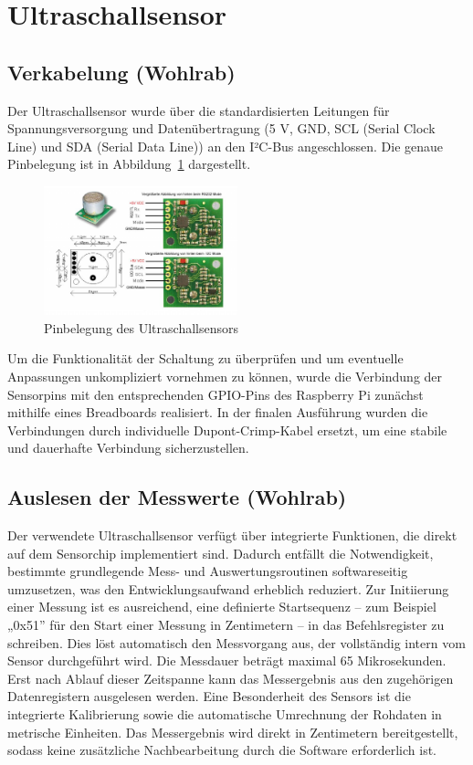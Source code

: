 \section{Ultraschallsensor}

\subsection{Verkabelung (Wohlrab)}

Der Ultraschallsensor wurde über die standardisierten Leitungen für Spannungsversorgung und Datenübertragung (5 V, GND, SCL (Serial Clock Line) und SDA (Serial Data Line)) an den I²C-Bus angeschlossen. 
Die genaue Pinbelegung ist in Abbildung~\ref{fig:ultraschall_pinbelegung} dargestellt.
\begin{figure}[ht]
    \centering
    \includegraphics[width=0.5\textwidth, keepaspectratio]{images/wohlrab_srf02.png}
    \caption{Pinbelegung des Ultraschallsensors \cite{bild_ultraschall}}
    \label{fig:ultraschall_pinbelegung}
\end{figure}
Um die Funktionalität der Schaltung zu überprüfen und um eventuelle Anpassungen unkompliziert vornehmen zu können, wurde die Verbindung der Sensorpins mit den entsprechenden GPIO-Pins des Raspberry Pi zunächst mithilfe eines Breadboards realisiert.
In der finalen Ausführung wurden die Verbindungen durch individuelle Dupont-Crimp-Kabel ersetzt, um eine stabile und dauerhafte Verbindung sicherzustellen.

\subsection{Auslesen der Messwerte (Wohlrab)}

Der verwendete Ultraschallsensor verfügt über integrierte Funktionen, die direkt auf dem Sensorchip implementiert sind. 
Dadurch entfällt die Notwendigkeit, bestimmte grundlegende Mess- und Auswertungsroutinen softwareseitig umzusetzen, was den Entwicklungsaufwand erheblich reduziert.
Zur Initiierung einer Messung ist es ausreichend, eine definierte Startsequenz – zum Beispiel „0x51” für den Start einer Messung in Zentimetern – in das Befehlsregister zu schreiben. 
Dies löst automatisch den Messvorgang aus, der vollständig intern vom Sensor durchgeführt wird. Die Messdauer beträgt maximal 65 Mikrosekunden. 
Erst nach Ablauf dieser Zeitspanne kann das Messergebnis aus den zugehörigen Datenregistern ausgelesen werden.
Eine Besonderheit des Sensors ist die integrierte Kalibrierung sowie die automatische Umrechnung der Rohdaten in metrische Einheiten. 
Das Messergebnis wird direkt in Zentimetern bereitgestellt, sodass keine zusätzliche Nachbearbeitung durch die Software erforderlich ist.

